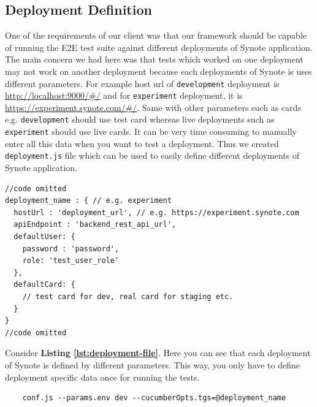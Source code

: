 \subsection{Deployment Definition}
\label{subsec:deployment-definition}
One of the requirements of our client was that our framework should be capable of running the E2E test suite against different deployments of Synote application. The main concern we had here was that tests which worked on one deployment may not work on another deployment because each deployments of Synote is uses different parameters. For example host url of \texttt{development} deployment is \url{http://localhost:9000/\#/} and for  \texttt{experiment} deployment, it is \url{https://experiment.synote.com/\#/}. Same with other parameters such as cards e.g. \texttt{development} should use test card whereas live deployments such as \texttt{experiment} should use live cards. It can be very time consuming to manually enter all this data when you want to test a deployment. Thus we created \texttt{deployment.js} file which can be used to easily define different deployments of Synote application.

\begin{listing}[H]
\begin{verbatim}
//code omitted
deployment_name : { // e.g. experiment
  hostUrl : 'deployment_url', // e.g. https://experiment.synote.com
  apiEndpoint : 'backend_rest_api_url',
  defaultUser: {
    password : 'password',
    role: 'test_user_role'
  },
  defaultCard: {
    // test card for dev, real card for staging etc.
  }
}
//code omitted
\end{verbatim}
\label{lst:deployment-file}
\end{listing}

Consider \textbf{Listing \ref{lst:deployment-file}}. Here you can see that each deployment of Synote is defined by different parameters. This way, you only have to define deployment specific data once for running the tests.

\begin{listing}[H]
\begin{verbatim}
	conf.js --params.env dev --cucumberOpts.tgs=@deployment_name
\end{verbatim}
\label{lst:specifying-deployment-test-run}
\end{listing}

